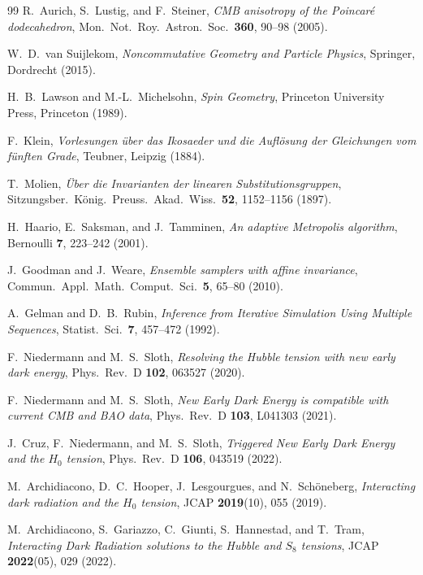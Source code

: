 \documentclass[11pt,a4paper]{article}
\theoremstyle{definition}
\begin{document}
\begin{thebibliography}{99}
R.~Aurich, S.~Lustig, and F.~Steiner,
\textit{CMB anisotropy of the Poincar\'e dodecahedron},
Mon.\ Not.\ Roy.\ Astron.\ Soc.\ \textbf{360}, 90--98 (2005).

W.~D.~van Suijlekom,
\textit{Noncommutative Geometry and Particle Physics},
Springer, Dordrecht (2015).

H.~B.~Lawson and M.-L.~Michelsohn,
\textit{Spin Geometry},
Princeton University Press, Princeton (1989).

F.~Klein,
\textit{Vorlesungen \"uber das Ikosaeder und die Aufl\"osung der Gleichungen vom f\"unften Grade},
Teubner, Leipzig (1884).

T.~Molien,
\textit{\"Uber die Invarianten der linearen Substitutionsgruppen},
Sitzungsber.\ K\"onig.\ Preuss.\ Akad.\ Wiss.\ \textbf{52}, 1152--1156 (1897).

H.~Haario, E.~Saksman, and J.~Tamminen,
\textit{An adaptive Metropolis algorithm},
Bernoulli \textbf{7}, 223--242 (2001).

J.~Goodman and J.~Weare,
\textit{Ensemble samplers with affine invariance},
Commun.\ Appl.\ Math.\ Comput.\ Sci.\ \textbf{5}, 65--80 (2010).

A.~Gelman and D.~B.~Rubin,
\textit{Inference from Iterative Simulation Using Multiple Sequences},
Statist.\ Sci.\ \textbf{7}, 457--472 (1992).

F.~Niedermann and M.~S.~Sloth,
\textit{Resolving the Hubble tension with new early dark energy},
Phys.\ Rev.\ D \textbf{102}, 063527 (2020).

F.~Niedermann and M.~S.~Sloth,
\textit{New Early Dark Energy is compatible with current CMB and BAO data},
Phys.\ Rev.\ D \textbf{103}, L041303 (2021).

J.~Cruz, F.~Niedermann, and M.~S.~Sloth,
\textit{Triggered New Early Dark Energy and the $H_0$ tension},
Phys.\ Rev.\ D \textbf{106}, 043519 (2022).

M.~Archidiacono, D.~C.~Hooper, J.~Lesgourgues, and N.~Sch{\"o}neberg,
\textit{Interacting dark radiation and the $H_0$ tension},
JCAP \textbf{2019}(10), 055 (2019).

M.~Archidiacono, S.~Gariazzo, C.~Giunti, S.~Hannestad, and T.~Tram,
\textit{Interacting Dark Radiation solutions to the Hubble and $S_8$ tensions},
JCAP \textbf{2022}(05), 029 (2022).


\end{thebibliography}
\end{document}
